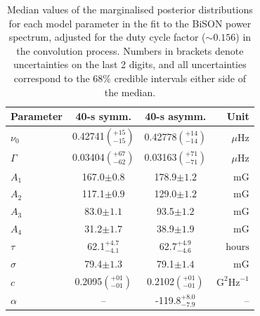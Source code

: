\begin{table}[ht!]
	\begin{center}
		\caption{Median values of the marginalised posterior distributions for each model parameter in the fit to the BiSON power spectrum, adjusted for the duty cycle factor ($\sim 0.156$) in the convolution process. Numbers in brackets denote uncertainties on the last 2 digits, and all uncertainties correspond to the $68 \%$ credible intervals either side of the median.}
		\label{tab:PSD_fit_params}
		\begin{tabular}{l c c r}
			\hline
			{\bf Parameter} & {\bf 40-s symm.} & {\bf 40-s asymm.} & {\bf Unit} \\
			\hline
			
			{$\nu_0$} & {0.42741$\left(_{-15}^{+15}\right)$} & {0.42778$\left(_{-14}^{+14}\right)$} & {$\mu\mathrm{Hz} $}\\
			
			{$\Gamma$} & {0.03404$\left(_{-62}^{+67}\right)$} & {0.03163$\left(_{-71}^{+71}\right)$} & {$\mu\mathrm{Hz} $} \\
			
			{$A_1$} & {167.0$\pm 0.8$} & {178.9$\pm 1.2$} & {$\mathrm{mG}$} \\
			
			{$A_2$} & {117.1$\pm 0.9$} & {129.0$\pm 1.2$} & {$\mathrm{mG}$} \\
			
			{$A_3$} & {83.0$\pm 1.1$} & {93.5$\pm 1.2$} & {$\mathrm{mG}$} \\
			
			{$A_4$} & {31.2$\pm 1.7$} & {38.9$\pm 1.9$} &  {$\mathrm{mG}$} \\	
			
			{$\tau$} & {62.1$_{-4.1}^{+4.7}$} & {62.7$_{-4.6}^{+4.9}$} & {$\mathrm{hours}$} \\	
			
			{$\sigma$} & {79.4$\pm 1.3$} & {79.1$\pm 1.4$} &  {$\mathrm{mG}$} \\	
			
			{$c$} & {0.2095$\left(_{-01}^{+01}\right)$} & {0.2102$\left(_{-01}^{+01}\right)$}  & {$\mathrm{G}^2\mathrm{Hz}^{-1}$} \\	
			
			{$\alpha$} & {--} & {-119.8$_{-7.9}^{+8.0}$} & {--} \\	
			\hline
		\end{tabular}
	\end{center}
\end{table}


